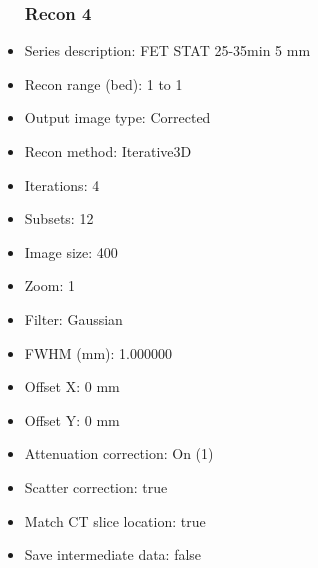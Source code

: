 \documentclass[12pt]{article}
\begin{document}
\begin{itemize}
\subsubsection{Recon 4}
\item Series description: FET STAT 25-35min 5 mm
\item Recon range (bed): 1 to 1
\item Output image type: Corrected
\item Recon method: Iterative3D
\item Iterations: 4
\item Subsets: 12
\item Image size: 400
\item Zoom: 1
\item Filter: Gaussian
\item FWHM (mm): 1.000000
\item Offset X: 0 mm
\item Offset Y: 0 mm
\item Attenuation correction: On (1)
\item Scatter correction: true
\item Match CT slice location: true
\item Save intermediate data: false
\end{itemize}
\end{document}
